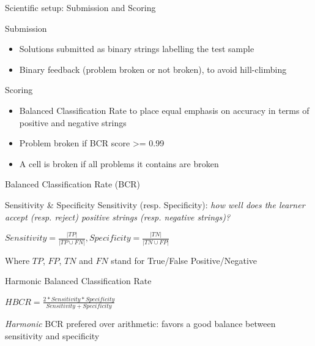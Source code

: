 \begin{frame}{Scientific setup: Submission and Scoring}

  \begin{block}{Submission}
    \begin{itemize}
      \item Solutions submitted as binary strings labelling the test sample
      \item Binary feedback (problem broken or not broken), to avoid hill-climbing
    \end{itemize}
  \end{block}

  \begin{block}{Scoring}
    \begin{itemize}
      \item Balanced Classification Rate to place equal emphasis on accuracy in terms of positive 
            and negative strings
      \item Problem broken if BCR score >= 0.99
      \item A cell is broken if all problems it contains are broken
    \end{itemize}
  \end{block}

\end{frame}

\begin{frame}{Balanced Classification Rate (BCR)}

  \begin{block}{Sensitivity \& Specificity}
    Sensitivity (resp. Specificity): \emph{how well does the learner accept (resp. reject)
    positive strings (resp. negative strings)?}
    \begin{center}
    \begin{math}
      Sensitivity=\frac{|TP|}{|TP \cup FN|},
      Specificity=\frac{|TN|}{|TN \cup FP|}
    \end{math}
    \end{center}
    Where $TP$, $FP$, $TN$ and $FN$ stand for True/False Positive/Negative
  \end{block}

  \begin{block}{Harmonic Balanced Classification Rate}
    \begin{center}$HBCR=\frac{2*Sensitivity*Specificity}{Sensitivity + Specificity}$\end{center}
    \emph{Harmonic} BCR prefered over arithmetic: favors a good balance between sensitivity 
    and specificity
  \end{block}

\end{frame}

